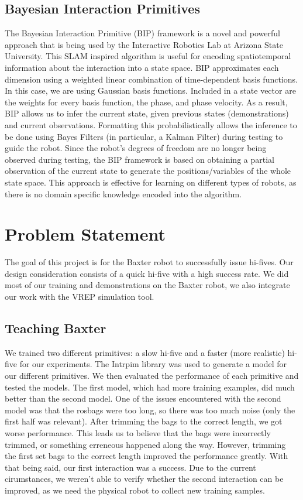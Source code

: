 \documentclass[letterpaper, 10 pt, conference]{ieeeconf}  %
\begin{document}
\subsection{Bayesian Interaction Primitives}
The Bayesian Interaction Primitive (BIP) framework is a novel and powerful approach that is being used by the Interactive Robotics Lab at Arizona State University. This SLAM inspired algorithm is useful for encoding spatiotemporal information about the interaction into a state space. BIP approximates each dimension using a weighted linear combination of time-dependent basis functions. In this case, we are using Gaussian basis functions. Included in a state vector are the weights for every basis function, the phase, and phase velocity. As a result, BIP allows us to infer the current state, given previous states (demonstrations) and current observations. Formatting this probabilistically allows the inference to be done using Bayes Filters (in particular, a Kalman Filter) during testing to guide the robot. Since the robot's degrees of freedom are no longer being observed during testing, the BIP framework is based on obtaining a partial observation of the current state to generate the positions/variables of the whole state space. This approach is effective for learning on different types of robots, as there is no domain specific knowledge encoded into the algorithm.

\section{Problem Statement}
The goal of this project is for the Baxter robot to successfully issue hi-fives. Our design consideration consists of a quick hi-five with a high success rate. We did most of our training and demonstrations on the Baxter robot, we also integrate our work with the VREP simulation tool.

\subsection{Teaching Baxter}

We trained two different primitives: a slow hi-five and a faster (more realistic) hi-five for our experiments. The Intrpim library was used to generate a model for our different primitives. We then evaluated the performance of each primitive and tested the models. The first model, which had more training examples, did much better than the second model. One of the issues encountered with the second model was that the rosbags were too long, so there was too much noise (only the first half was relevant). After trimming the bags to the correct length, we got worse performance. This leads us to believe that the bags were incorrectly trimmed, or something erreneous happened along the way. However, trimming the first set bags to the correct length improved the performance greatly. With that being said, our first interaction was a success. Due to the current cirumstances, we weren't able to verify whether the second interaction can be improved, as we need the physical robot to collect new training samples.
\end{document}
